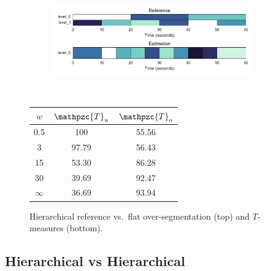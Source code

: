 \documentclass{article}
\def\shag{\ensuremath{\mathpzc{T}}}
\begin{document}
\begin{figure}[t]
  \centering
  \begin{subfigure}{0.5\textwidth}
    \centering
    \includegraphics[width=0.94\textwidth]{figs/hier-flatsmaller.pdf}
  \end{subfigure}%
  \\
  \begin{minipage}{0.5\textwidth}
    \centering
    \vspace{10pt}
    \begin{tabular}{|c|c|c|}
      \hline
      $w$       & $\shag_u$    & $\shag_o$      \\
      \hline
      0.5       & 100       & 55.56      \\     
      3         & 97.79     & 56.43      \\
      15        & 53.30     & 86.28    \\
      30        & 39.69     & 92.47    \\
      $\infty$  & 36.69     & 93.94    \\
      \hline
    \end{tabular}
  \end{minipage}
  \caption{Hierarchical reference vs.\ flat over-segmentation (top) and $T$-measures (bottom).}
  \label{fig:hier-flatsmaller}
\end{figure}
\subsection{Hierarchical vs Hierarchical}

\end{document}
